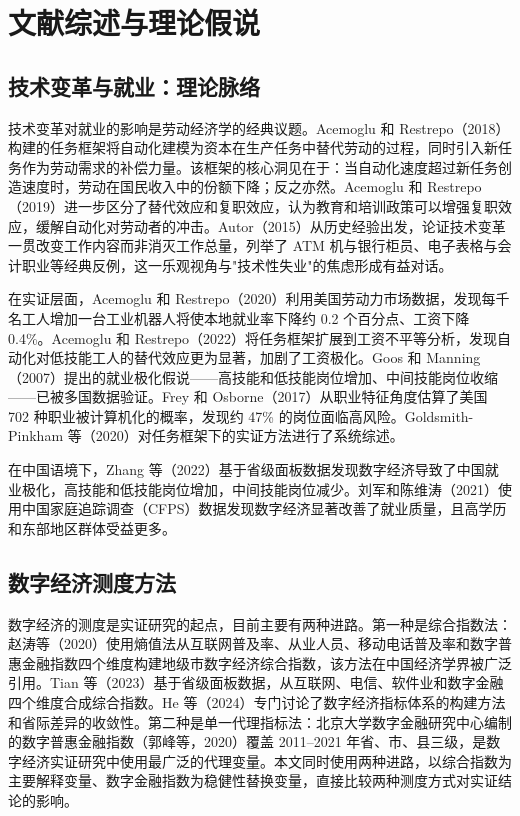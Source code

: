 \section{文献综述与理论假说}

\subsection{技术变革与就业：理论脉络}

技术变革对就业的影响是劳动经济学的经典议题。Acemoglu 和 Restrepo（2018）构建的任务框架将自动化建模为资本在生产任务中替代劳动的过程，同时引入新任务作为劳动需求的补偿力量。该框架的核心洞见在于：当自动化速度超过新任务创造速度时，劳动在国民收入中的份额下降；反之亦然。Acemoglu 和 Restrepo（2019）进一步区分了替代效应和复职效应，认为教育和培训政策可以增强复职效应，缓解自动化对劳动者的冲击。Autor（2015）从历史经验出发，论证技术变革一贯改变工作内容而非消灭工作总量，列举了 ATM 机与银行柜员、电子表格与会计职业等经典反例，这一乐观视角与"技术性失业"的焦虑形成有益对话。

在实证层面，Acemoglu 和 Restrepo（2020）利用美国劳动力市场数据，发现每千名工人增加一台工业机器人将使本地就业率下降约 0.2 个百分点、工资下降 0.4\%。Acemoglu 和 Restrepo（2022）将任务框架扩展到工资不平等分析，发现自动化对低技能工人的替代效应更为显著，加剧了工资极化。Goos 和 Manning（2007）提出的就业极化假说——高技能和低技能岗位增加、中间技能岗位收缩——已被多国数据验证。Frey 和 Osborne（2017）从职业特征角度估算了美国 702 种职业被计算机化的概率，发现约 47\% 的岗位面临高风险。Goldsmith-Pinkham 等（2020）对任务框架下的实证方法进行了系统综述。

在中国语境下，Zhang 等（2022）基于省级面板数据发现数字经济导致了中国就业极化，高技能和低技能岗位增加，中间技能岗位减少。刘军和陈维涛（2021）使用中国家庭追踪调查（CFPS）数据发现数字经济显著改善了就业质量，且高学历和东部地区群体受益更多。

\subsection{数字经济测度方法}

数字经济的测度是实证研究的起点，目前主要有两种进路。第一种是综合指数法：赵涛等（2020）使用熵值法从互联网普及率、从业人员、移动电话普及率和数字普惠金融指数四个维度构建地级市数字经济综合指数，该方法在中国经济学界被广泛引用。Tian 等（2023）基于省级面板数据，从互联网、电信、软件业和数字金融四个维度合成综合指数。He 等（2024）专门讨论了数字经济指标体系的构建方法和省际差异的收敛性。第二种是单一代理指标法：北京大学数字金融研究中心编制的数字普惠金融指数（郭峰等，2020）覆盖 2011--2021 年省、市、县三级，是数字经济实证研究中使用最广泛的代理变量。本文同时使用两种进路，以综合指数为主要解释变量、数字金融指数为稳健性替换变量，直接比较两种测度方式对实证结论的影响。

